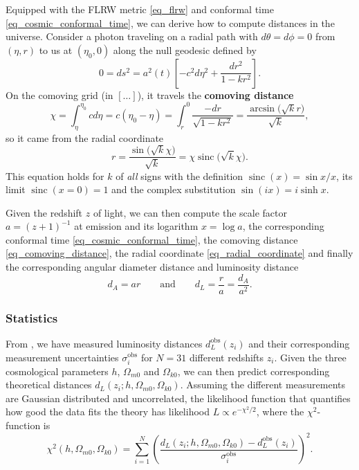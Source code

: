 \documentclass[10pt,a4paper]{article}
\DeclareMathOperator{\sinc}{sinc}
\begin{document}
Equipped with the FLRW metric \eqref{eq_flrw} and conformal time \eqref{eq_cosmic_conformal_time},
we can derive how to compute distances in the universe.
Consider a photon traveling on a radial path with $d\theta = d\phi = 0$ from $(\eta,r)$ to us at $(\eta_0, 0)$ along the null geodesic defined by
\begin{equation*}
	0 = ds^2 = a^2(t) \left[ -c^2 d\eta^2 + \frac{dr^2}{1-kr^2} \right].
\end{equation*}
On the comoving grid (in $[\ldots]$), it travels the \textbf{comoving distance}
\begin{equation}
	\chi = \int_{\eta}^{\eta_0} c d\eta = c(\eta_0 - \eta) = \int_r^0 \frac{-dr}{\sqrt{1-kr^2}} = \frac{\arcsin\Big(\sqrt{k}r\Big)}{\sqrt{k}},
\label{eq_comoving_distance}
\end{equation}
so it came from the radial coordinate
\begin{equation}
	r = \frac{\sin\Big(\sqrt{k}\chi\Big)}{\sqrt{k}} = \chi \sinc\Big(\sqrt{k}\chi\Big).
\label{eq_radial_coordinate}
\end{equation}
This equation holds for $k$ of \emph{all} signs with the definition $\sinc(x) = \sin x / x$,
its limit $\sinc(x=0)=1$ and the complex substitution $\sin(ix) = i \sinh x$.

Given the redshift $z$ of light,
we can then compute the scale factor $a = (z+1)^{-1}$ at emission and its logarithm $x = \log a$,
the corresponding conformal time \eqref{eq_cosmic_conformal_time},
the comoving distance \eqref{eq_comoving_distance}, the radial coordinate \eqref{eq_radial_coordinate}
and finally the corresponding angular diameter distance and luminosity distance
\begin{equation}
	d_A = a r
	\qquad \text{and} \qquad
	d_L = \frac{r}{a} = \frac{d_A}{a^2}.
\label{eq_distances}
\end{equation}

\subsubsection{Statistics}

From \cite{betouleImprovedCosmologicalConstraints2014},
we have measured luminosity distances $d_{L}^\text{obs}(z_i)$ and their
corresponding measurement uncertainties $\sigma_i^\text{obs}$
for $N=31$ different redshifts $z_i$.
Given the three cosmological parameters $h$, $\Omega_{m0}$ and $\Omega_{k0}$,
we can then predict corresponding theoretical distances $d_L(z_i; h, \Omega_{m0}, \Omega_{k0})$.
Assuming the different measurements are Gaussian distributed and uncorrelated,
the likelihood function that quantifies how good the data fits the theory has likelihood $L \propto e^{-\chi^2/2}$, where the $\chi^2$-function is
\begin{equation}
	\chi^2(h,\Omega_{m0},\Omega_{k0}) = \sum_{i=1}^{N} \left( \frac{d_L(z_i; h, \Omega_{m0}, \Omega_{k0}) - d_{L}^\text{obs}(z_i)}{\sigma_i^\text{obs}} \right)^2.
\label{eq_chi2}
\end{equation}
\end{document}
